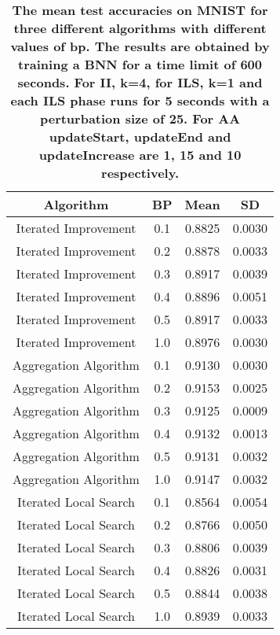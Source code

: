 \begin{center}
\begin{table}[!tb]
\centering
\begin{tabular}{|c|c|c|c|}
  \hline
Algorithm & BP & Mean & SD \\ 
  \hline
Iterated Improvement & 0.1 & 0.8825 & 0.0030 \\ 
   \hline
Iterated Improvement & 0.2 & 0.8878 & 0.0033 \\ 
   \hline
Iterated Improvement & 0.3 & 0.8917 & 0.0039 \\ 
   \hline
Iterated Improvement & 0.4 & 0.8896 & 0.0051 \\ 
   \hline
Iterated Improvement & 0.5 & 0.8917 & 0.0033 \\ 
   \hline
Iterated Improvement & 1.0 & 0.8976 & 0.0030 \\ 
   \hline
Aggregation Algorithm & 0.1 & 0.9130 & 0.0030 \\ 
   \hline
Aggregation Algorithm & 0.2 & 0.9153 & 0.0025 \\ 
   \hline
Aggregation Algorithm & 0.3 & 0.9125 & 0.0009 \\ 
   \hline
Aggregation Algorithm & 0.4 & 0.9132 & 0.0013 \\ 
   \hline
Aggregation Algorithm & 0.5 & 0.9131 & 0.0032 \\ 
   \hline
Aggregation Algorithm & 1.0 & 0.9147 & 0.0032 \\ 
   \hline
Iterated Local Search & 0.1 & 0.8564 & 0.0054 \\ 
   \hline
Iterated Local Search & 0.2 & 0.8766 & 0.0050 \\ 
   \hline
Iterated Local Search & 0.3 & 0.8806 & 0.0039 \\ 
   \hline
Iterated Local Search & 0.4 & 0.8826 & 0.0031 \\ 
   \hline
Iterated Local Search & 0.5 & 0.8844 & 0.0038 \\ 
   \hline
Iterated Local Search & 1.0 & 0.8939 & 0.0033 \\ 
   \hline
\end{tabular}
\caption{\small{\textbf{The mean test accuracies on MNIST for three different algorithms with different values of bp.
            The results are obtained by training a BNN for a time limit of 600 seconds. For II, k=4, for
            ILS, k=1 and each ILS phase runs for 5 seconds with a perturbation size of 25. For AA updateStart, updateEnd
            and updateIncrease are 1, 15 and 10 respectively.}}} 
\label{MBT_FTBP}
\end{table}

\end{center}
